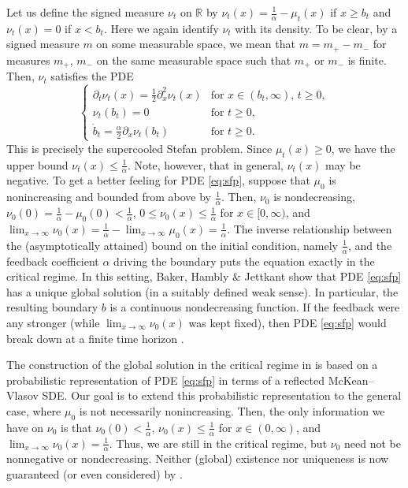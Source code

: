 \documentclass[11pt, a4paper]{article}
\theoremstyle{plain}
\theoremstyle{definition}
\theoremstyle{remark}
\numberwithin{equation}{section}
\newcommand{\R}{\mathbb{R}}
\begin{document}
Let us define the signed measure $\nu_t$ on $\R$ by $\nu_t(x) = \frac{1}{\alpha} - \mu_t(x)$ if $x \geq b_t$ and $\nu_t(x) = 0$ if $x < b_t$. Here we again identify $\nu_t$ with its density. To be clear, by a signed measure $m$ on some measurable space, we mean that $m = m_+ - m_-$ for measures $m_+$, $m_-$ on the same measurable space such that $m_+$ or $m_-$ is finite. Then, $\nu_t$ satisfies the PDE 
\begin{equation} \label{eq:sfp}
    \begin{cases}
    \partial_t \nu_t(x) = \frac{1}{2} \partial_x^2 \nu_t(x) &\text{for } x \in (b_t, \infty),\, t \geq 0, \\
    \nu_t(b_t) = 0 &\text{for } t \geq 0, \\
    \dot{b}_t = \frac{\alpha}{2} \partial_x \nu_t(b_t) &\text{for } t \geq 0.
\end{cases}
\end{equation}
This is precisely the supercooled Stefan problem. Since $\mu_t(x) \geq 0$, we have the upper bound $\nu_t(x) \leq \frac{1}{\alpha}$. Note, however, that in general, $\nu_t(x)$ may be negative. To get a better feeling for PDE \eqref{eq:sfp}, suppose that $\mu_0$ is nonincreasing and bounded from above by $\frac{1}{\alpha}$. Then, $\nu_0$ is nondecreasing, $\nu_0(0) = \frac{1}{\alpha} - \mu_0(0) < \frac{1}{\alpha}$, $0 \leq \nu_0(x) \leq \frac{1}{\alpha}$ for $x \in [0, \infty)$, and $\lim_{x \to \infty} \nu_0(x) = \frac{1}{\alpha} - \lim_{x \to \infty} \mu_0(x) = \frac{1}{\alpha}$. The inverse relationship between the (asymptotically attained) bound on the initial condition, namely $\frac{1}{\alpha}$, and the feedback coefficient $\alpha$ driving the boundary puts the equation exactly in the critical regime. In this setting, Baker, Hambly \& Jettkant \cite{baker_loc_times_2025} show that PDE \eqref{eq:sfp} has a unique global solution (in a suitably defined weak sense). In particular, the resulting boundary $b$ is a continuous nondecreasing function. If the feedback were any stronger (while $\lim_{x \to \infty} \nu_0(x)$ was kept fixed), then PDE \eqref{eq:sfp} would break down at a finite time horizon \cite[Theorem 1.12]{baker_loc_times_2025}. 

The construction of the global solution in the critical regime in \cite{baker_loc_times_2025} is based on a probabilistic representation of PDE \eqref{eq:sfp} in terms of a reflected McKean--Vlasov SDE. Our goal is to extend this probabilistic representation to the general case, where $\mu_0$ is not necessarily nonincreasing. Then, the only information we have on $\nu_0$ is that $\nu_0(0) < \frac{1}{\alpha}$, $\nu_0(x) \leq \frac{1}{\alpha}$ for $x \in (0, \infty)$, and $\lim_{x \to \infty} \nu_0(x) = \frac{1}{\alpha}$. Thus, we are still in the critical regime, but $\nu_0$ need not be nonnegative or nondecreasing. Neither (global) existence nor uniqueness is now guaranteed (or even considered) by \cite{baker_loc_times_2025}. 
\end{document}
